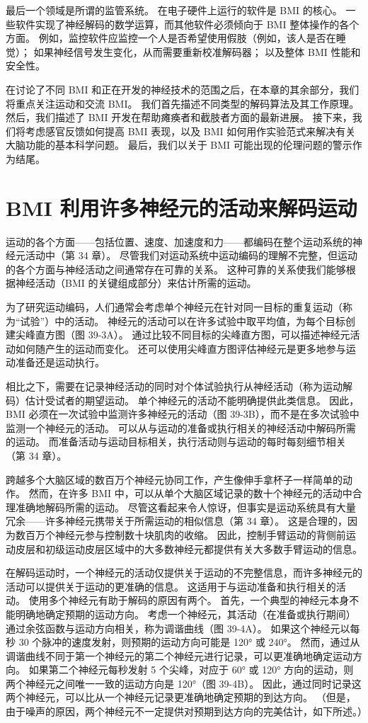最后一个领域是所谓的监管系统。 在电子硬件上运行的软件是 BMI 的核心。 一些软件实现了神经解码的数学运算，而其他软件必须倾向于 BMI 整体操作的各个方面。 例如，监控软件应监控一个人是否希望使用假肢（例如，该人是否在睡觉）； 如果神经信号发生变化，从而需要重新校准解码器； 以及整体 BMI 性能和安全性。

在讨论了不同 BMI 和正在开发的神经技术的范围之后，在本章的其余部分，我们将重点关注运动和交流 BMI。 我们首先描述不同类型的解码算法及其工作原理。 然后，我们描述了 BMI 开发在帮助瘫痪者和截肢者方面的最新进展。 接下来，我们将考虑感官反馈如何提高 BMI 表现，以及 BMI 如何用作实验范式来解决有关大脑功能的基本科学问题。 最后，我们以关于 BMI 可能出现的伦理问题的警示作为结尾。

\section{BMI 利用许多神经元的活动来解码运动}
运动的各个方面——包括位置、速度、加速度和力——都编码在整个运动系统的神经元活动中（第 34 章）。 尽管我们对运动系统中运动编码的理解不完整，但运动的各个方面与神经活动之间通常存在可靠的关系。 这种可靠的关系使我们能够根据神经活动（BMI 的关键组成部分）来估计所需的运动。

为了研究运动编码，人们通常会考虑单个神经元在针对同一目标的重复运动（称为“试验”）中的活动。 神经元的活动可以在许多试验中取平均值，为每个目标创建尖峰直方图（图 39-3A）。 通过比较不同目标的尖峰直方图，可以描述神经元活动如何随产生的运动而变化。 还可以使用尖峰直方图评估神经元是更多地参与运动准备还是运动执行。

相比之下，需要在记录神经活动的同时对个体试验执行从神经活动（称为运动解码）估计受试者的期望运动。 单个神经元的活动不能明确提供此类信息。 因此，BMI 必须在一次试验中监测许多神经元的活动（图 39-3B），而不是在多次试验中监测一个神经元的活动。 可以从与运动的准备或执行相关的神经活动中解码所需的运动。 而准备活动与运动目标相关，执行活动则与运动的每时每刻细节相关（第 34 章）。

跨越多个大脑区域的数百万个神经元协同工作，产生像伸手拿杯子一样简单的动作。 然而，在许多 BMI 中，可以从单个大脑区域记录的数十个神经元的活动中合理准确地解码所需的运动。 尽管这看起来令人惊讶，但事实是运动系统具有大量冗余——许多神经元携带关于所需运动的相似信息（第 34 章）。 这是合理的，因为数百万个神经元参与控制数十块肌肉的收缩。 因此，控制手臂运动的背侧前运动皮层和初级运动皮层区域中的大多数神经元都提供有关大多数手臂运动的信息。

在解码运动时，一个神经元的活动仅提供关于运动的不完整信息，而许多神经元的活动可以提供关于运动的更准确的信息。 这适用于与运动准备和执行相关的活动。 使用多个神经元有助于解码的原因有两个。 首先，一个典型的神经元本身不能明确地确定预期的运动方向。 考虑一个神经元，其活动（在准备或执行期间）通过余弦函数与运动方向相关，称为调谐曲线（图 39-4A）。 如果这个神经元以每秒 30 个脉冲的速度发射，则预期的运动方向可能是 120° 或 240°。 然而，通过从调谐曲线不同于第一个神经元的第二个神经元进行记录，可以更准确地确定运动方向。 如果第二个神经元每秒发射 5 个尖峰，对应于 60° 或 120° 方向的运动，则两个神经元之间唯一一致的运动方向是 120°（图 39-4B）。 因此，通过同时记录这两个神经元，可以比从一个神经元记录更准确地确定预期的到达方向。 （但是，由于噪声的原因，两个神经元不一定提供对预期到达方向的完美估计，如下所述。）

